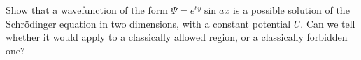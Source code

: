 Show that a wavefunction of the form
$\Psi = e^{by} \sin ax $ is a possible solution of the Schr\"odinger equation
in two dimensions, with a constant potential $U$.
Can we tell whether it would apply to a classically allowed
region, or a classically forbidden one?
